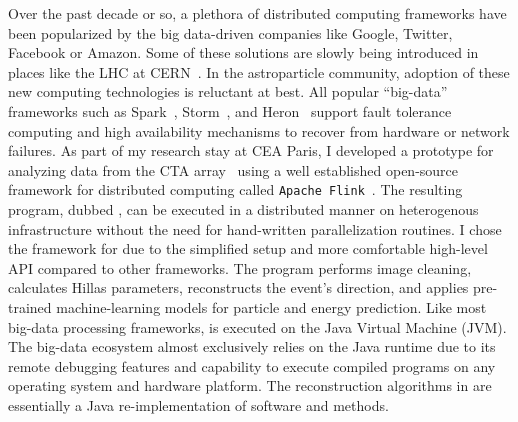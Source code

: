 Over the past decade or so, a plethora of distributed computing frameworks have been popularized
by the big data-driven companies like Google, Twitter, Facebook or Amazon. Some of these solutions are
slowly being introduced in places like the LHC at CERN~\cite{hadop_cern}.
In the astroparticle community, adoption of these new computing technologies is reluctant at best.
All popular \enquote{big-data} frameworks such as Spark~\cite{spark}, Storm~\cite{storm}, and Heron~\cite{heron} support fault tolerance computing
and high availability mechanisms to recover from hardware or network failures.
As part of my research stay at CEA Paris, I developed a prototype for analyzing data from the CTA array~\cite{rta_adass} using
a well established open-source framework for distributed computing called \texttt{Apache Flink}~\cite{flink}.
The resulting program, dubbed \jayct, can be executed in a distributed manner on heterogenous infrastructure without the need for 
hand-written parallelization routines.
I chose the \flink framework for \jayct due to the simplified setup and more comfortable high-level API compared to other frameworks.
The program performs image cleaning, calculates Hillas parameters, reconstructs the event's direction, and applies pre-trained machine-learning models for particle and energy prediction.
Like most big-data processing frameworks, \flink is executed on the Java Virtual Machine (JVM). 
The big-data ecosystem almost exclusively relies on the Java runtime due to its remote debugging features and capability 
to execute compiled programs on any operating system and hardware platform. 
The reconstruction algorithms in \jayct are essentially a Java re-implementation of \fact software and \ctapipe methods.

